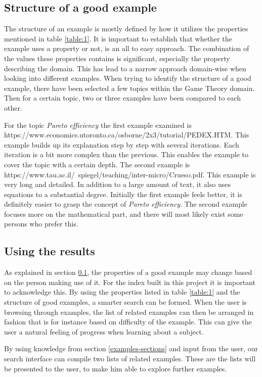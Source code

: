 \subsection{Structure of a good example} \label{good_example}

The structure of an example is mostly defined by how it utilizes the properties mentioned in table \ref{table:1}. It is important to establish that whether the example uses a property or not, is an all to easy approach. The combination of the values these properties contains is significant, especially the property describing the domain. This has lead to a narrow approach domain-wise when looking into different examples.
When trying to identify the structure of a good example, there have been selected a few topics within the Game Theory domain. Then for a certain topic, two or three examples have been compared to each other.  %

For the topic \textit{Pareto efficiency} the first example examined is\\ https://www.economics.utoronto.ca/osborne/2x3/tutorial/PEDEX.HTM. This example builds up its explanation step by step with several iterations. Each iteration is a bit more complex than the previous. This enables the example to cover the topic with a certain depth. The second example is https://www.tau.ac.il/~spiegel/teaching/inter-micro/Crueso.pdf. This example is very long and detailed. In addition to a large amount of text, it also uses equations to a substantial degree. Initially the first example feels better, it is definitely easier to grasp the concept of \textit{Pareto efficiency}. The second example focuses more on the mathematical part, and there will most likely exist some persons who prefer this. 

\subsection{Using the results}

As explained in section \ref{good_example}, the properties of a good example may change based on the person making use of it. For the index built in this project it is important to acknowledge this. By using the properties listed in table \ref{table:1} and the structure of good examples, a smarter search can be formed. When the user is browsing through examples, the list of related examples can then be arranged in fashion that is for instance based on difficulty of the example. This can give the user a natural feeling of progress when learning about a subject.

By using knowledge from section \ref{examples-sections} and input from the user, our search interface can compile two lists of related examples. These are the lists will be presented to the user, to make him able to explore further examples. 



\cleardoublepage